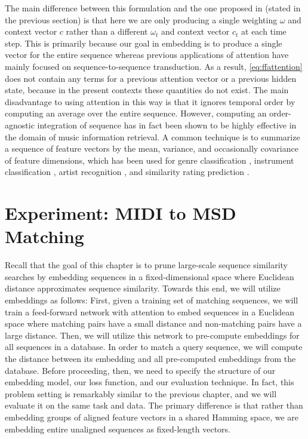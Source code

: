 The main difference between this formulation and the one proposed in \cite{bahdanau2014neural, cho2015describing} (stated in the previous section) is that here we are only producing a single weighting $\omega$ and context vector $c$ rather than a different $\omega_t$ and context vector $c_t$ at each time step.
This is primarily because our goal in embedding is to produce a single vector for the entire sequence whereas previous applications of attention have mainly focused on sequence-to-sequence transduction.
As a result, \cref{eq:ffattention} does not contain any terms for a previous attention vector or a previous hidden state, because in the present contexts these quantities do not exist.
The main disadvantage to using attention in this way is that it ignores temporal order by computing an average over the entire sequence.
However, computing an order-agnostic integration of sequence has in fact been shown to be highly effective in the domain of music information retrieval.
A common technique is to summarize a sequence of feature vectors by the mean, variance, and occasionally covariance of feature dimensions, which has been used for genre classification \cite{tzanetakis2002musical}, instrument classification \cite{deng2008study}, artist recognition \cite{mandel2005song}, and similarity rating prediction \cite{foster2014sequential}.

\section{Experiment: MIDI to MSD Matching}
\label{sec:pse_experiment}

Recall that the goal of this chapter is to prune large-scale sequence similarity searches by embedding sequences in a fixed-dimensional space where Euclidean distance approximates sequence similarity.
Towards this end, we will utilize embeddings as follows:
First, given a training set of matching sequences, we will train a feed-forward network with attention to embed sequences in a Euclidean space where matching pairs have a small distance and non-matching pairs have a large distance.
Then, we will utilize this network to pre-compute embeddings for all sequences in a database.
In order to match a query sequence, we will compute the distance between its embedding and all pre-computed embeddings from the database.
Before proceeding, then, we need to specify the structure of our embedding model, our loss function, and our evaluation technique.
In fact, this problem setting is remarkably similar to the previous chapter, and we will evaluate it on the same task and data.
The primary difference is that rather than embedding groups of aligned feature vectors in a shared Hamming space, we are embedding entire unaligned sequences as fixed-length vectors.

